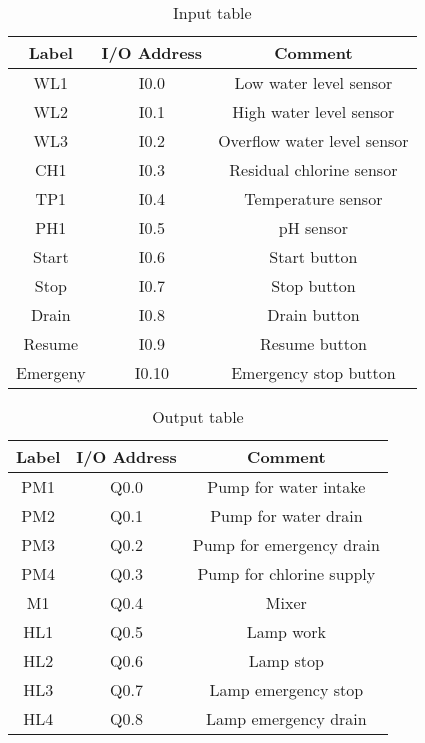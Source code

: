 \documentclass{article}
\begin{document}
\begin{table}[]
    \centering
    \begin{tabular}{|c|c|c|}
    \hline
       Label & I/O Address & Comment \\
       \hline
       WL1 & I0.0 & Low water level sensor\\
       \hline
       WL2 & I0.1 & High water level sensor\\
       \hline
       WL3 & I0.2 & Overflow water level sensor\\
       \hline
       CH1 & I0.3 & Residual chlorine sensor\\
       \hline
       TP1 & I0.4 & Temperature sensor\\
       \hline
       PH1 & I0.5 & pH sensor\\
       \hline
       Start & I0.6 & Start button\\
       \hline
       Stop & I0.7 & Stop button\\
       \hline
       Drain & I0.8 & Drain button\\
       \hline
       Resume & I0.9 & Resume button\\
       \hline
       Emergeny & I0.10 & Emergency stop button\\
       \hline
    \end{tabular}
    \caption{Input table}
    \label{tab:my_label}
\end{table}

\begin{table}[]
    \centering
    \begin{tabular}{|c|c|c|}
    \hline
       Label & I/O Address & Comment \\
       \hline
       PM1 & Q0.0 & Pump for water intake\\
       \hline
       PM2 & Q0.1 & Pump for water drain\\
       \hline
       PM3 & Q0.2 & Pump for emergency drain\\
       \hline
       PM4 & Q0.3 & Pump for chlorine supply\\
       \hline
       M1 & Q0.4 & Mixer\\
       \hline
       HL1 & Q0.5 & Lamp work\\
       \hline
       HL2 & Q0.6 & Lamp stop\\
       \hline
       HL3 & Q0.7 & Lamp emergency stop\\
       \hline
       HL4 & Q0.8 & Lamp emergency drain\\
       \hline
    \end{tabular}
    \caption{Output table}
    \label{tab:my_label}
\end{table}
\end{document}
